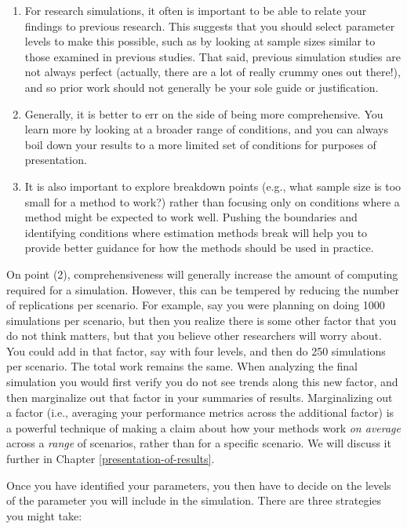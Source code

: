 \documentclass[
]{book}
\begin{document}
\begin{enumerate}
\def\labelenumi{\arabic{enumi}.}
\item
  For research simulations, it often is important to be able to relate your findings to previous research. This suggests that you should select parameter levels to make this possible, such as by looking at sample sizes similar to those examined in previous studies. That said, previous simulation studies are not always perfect (actually, there are a lot of really crummy ones out there!), and so prior work should not generally be your sole guide or justification.
\item
  Generally, it is better to err on the side of being more comprehensive. You learn more by looking at a broader range of conditions, and you can always boil down your results to a more limited set of conditions for purposes of presentation.
\item
  It is also important to explore breakdown points (e.g., what sample size is too small for a method to work?) rather than focusing only on conditions where a method might be expected to work well. Pushing the boundaries and identifying conditions where estimation methods break will help you to provide better guidance for how the methods should be used in practice.
\end{enumerate}

On point (2), comprehensiveness will generally increase the amount of computing required for a simulation. However, this can be tempered by reducing the number of replications per scenario.
For example, say you were planning on doing 1000 simulations per scenario, but then you realize there is some other factor that you do not think matters, but that you believe other researchers will worry about.
You could add in that factor, say with four levels, and then do 250 simulations per scenario.
The total work remains the same.
When analyzing the final simulation you would first verify you do not see trends along this new factor, and then marginalize out that factor in your summaries of results.
Marginalizing out a factor (i.e., averaging your performance metrics across the additional factor) is a powerful technique of making a claim about how your methods work \emph{on average} across a \emph{range} of scenarios, rather than for a specific scenario.
We will discuss it further in Chapter \ref{presentation-of-results}.

Once you have identified your parameters, you then have to decide on the levels of the parameter you will include in the simulation.
There are three strategies you might take:
\end{document}
